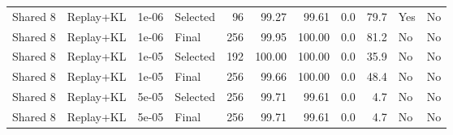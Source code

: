 \begin{tabular}{lll lrrrrrll}
Shared 8 & Replay+KL & 1e-06 & Selected & 96 & 99.27 & 99.61 & 0.0 & 79.7 & Yes & No \\
Shared 8 & Replay+KL & 1e-06 & Final & 256 & 99.95 & 100.00 & 0.0 & 81.2 & No & No \\
Shared 8 & Replay+KL & 1e-05 & Selected & 192 & 100.00 & 100.00 & 0.0 & 35.9 & No & No \\
Shared 8 & Replay+KL & 1e-05 & Final & 256 & 99.66 & 100.00 & 0.0 & 48.4 & No & No \\
Shared 8 & Replay+KL & 5e-05 & Selected & 256 & 99.71 & 99.61 & 0.0 & 4.7 & No & No \\
Shared 8 & Replay+KL & 5e-05 & Final & 256 & 99.71 & 99.61 & 0.0 & 4.7 & No & No \\
\bottomrule
\end{tabular}
